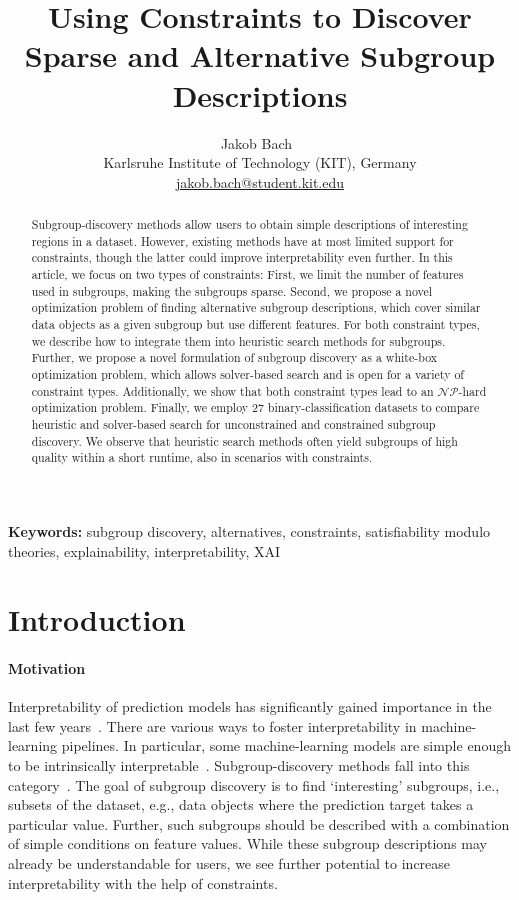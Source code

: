 \documentclass{article}
\title{
	Using Constraints to Discover Sparse and Alternative Subgroup Descriptions
}
\author{
	Jakob Bach~\orcidlink{0000-0003-0301-2798}\\
	\small Karlsruhe Institute of Technology (KIT), Germany\\
	\small \href{mailto:jakob.bach@student.kit.edu}{jakob.bach@student.kit.edu}
}
\date{} %
\theoremstyle{definition}
\begin{document}
\maketitle

\begin{abstract}
Subgroup-discovery methods allow users to obtain simple descriptions of interesting regions in a dataset.
However, existing methods have at most limited support for constraints, though the latter could improve interpretability even further.
In this article, we focus on two types of constraints:
First, we limit the number of features used in subgroups, making the subgroups sparse.
Second, we propose a novel optimization problem of finding alternative subgroup descriptions, which cover similar data objects as a given subgroup but use different features.
For both constraint types, we describe how to integrate them into heuristic search methods for subgroups.
Further, we propose a novel formulation of subgroup discovery as a white-box optimization problem, which allows solver-based search and is open for a variety of constraint types.
Additionally, we show that both constraint types lead to an $\mathcal{NP}$-hard optimization problem.
Finally, we employ 27 binary-classification datasets to compare heuristic and solver-based search for unconstrained and constrained subgroup discovery.
We observe that heuristic search methods often yield subgroups of high quality within a short runtime, also in scenarios with constraints.
\end{abstract}
%
\textbf{Keywords:} subgroup discovery, alternatives, constraints, satisfiability modulo theories, explainability, interpretability, XAI

\section{Introduction}
\label{sec:csd:introduction}

\paragraph{Motivation}

Interpretability of prediction models has significantly gained importance in the last few years~\cite{carvalho2019machine, molnar2020interpretable}.
There are various ways to foster interpretability in machine-learning pipelines.
In particular, some machine-learning models are simple enough to be intrinsically interpretable~\cite{carvalho2019machine}.
Subgroup-discovery methods fall into this category~\cite{atzmueller2015subgroup}.
The goal of subgroup discovery is to find `interesting' subgroups, i.e., subsets of the dataset, e.g., data objects where the prediction target takes a particular value.
Further, such subgroups should be described with a combination of simple conditions on feature values.
While these subgroup descriptions may already be understandable for users, we see further potential to increase interpretability with the help of constraints.
\end{document}
